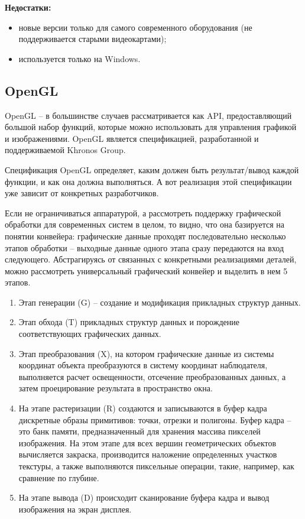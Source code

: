 \textbf{Недостатки:} 
\begin{itemize}
    \item новые версии только для самого современного оборудования (не поддерживается старыми видеокартами);
    \item используется только на Windows.
\end{itemize}


\subsection{OpenGL}

OpenGL -- в большинстве случаев рассматривается как API, предоставляющий большой набор функций, которые можно использовать для управления графикой и изображениями. OpenGL является спецификацией, разработанной и поддерживаемой Khronos Group.

Спецификация OpenGL определяет, каким должен быть результат/вывод каждой функции, и как она должна выполняться. А вот реализация этой спецификации уже зависит от конкретных разработчиков.

Если не ограничиваться аппаратурой, а рассмотреть поддержку графической обработки для современных систем в целом, то видно, что она базируется на понятии конвейера: графические данные проходят последовательно несколько этапов обработки -- выходные данные одного этапа сразу передаются на вход следующего. Абстрагируясь от связанных с конкретными реализациями деталей, можно рассмотреть универсальный графический конвейер и выделить в нем 5 этапов.

\begin{enumerate}
    \item Этап генерации (G) -- создание и модификация прикладных структур данных.
    \item Этап обхода (T) прикладных структур данных и порождение соответствующих графических данных.
    \item Этап преобразования (X), на котором графические данные из системы координат объекта преобразуются в систему координат наблюдателя, выполняется расчет освещенности, отсечение преобразованных данных, а затем проецирование результата в пространство окна.
    \item На этапе растеризации (R) создаются и записываются в буфер кадра дискретные образы примитивов: точки, отрезки и полигоны. Буфер кадра -- это банк памяти, предназначенный для хранения массива пикселей изображения. На этом этапе для всех вершин геометрических объектов вычисляется закраска, производится наложение определенных участков текстуры, а также выполняются пиксельные операции, такие, например, как сравнение по глубине.
    \item На этапе вывода (D) происходит сканирование буфера кадра и вывод изображения на экран дисплея.
\end{enumerate}


